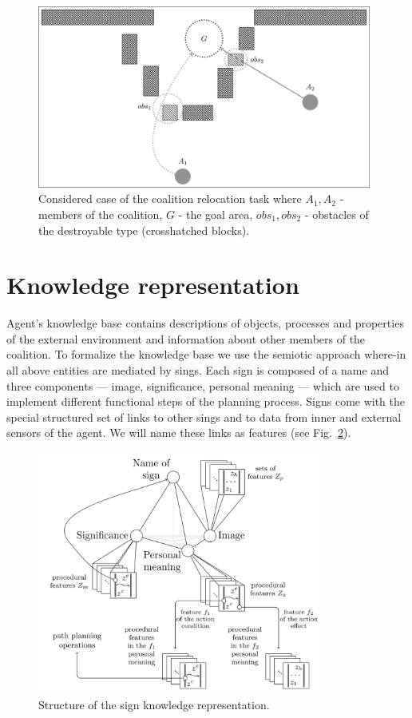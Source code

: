 \documentclass[runningheads,a4paper]{llncs}
\begin{document}
\begin{figure}
	\centering
	\includegraphics[height=6cm]{rita_example}
	\caption{Considered case of the coalition relocation task where $A_1, A_2$ - members of the coalition, $G$ - the goal area, $obs_1,obs_2$ - obstacles of the destroyable type (crosshatched blocks).}
	\label{fig:case}
\end{figure}

\section{Knowledge representation}\label{knowledge}

Agent's knowledge base contains descriptions of objects, processes and properties of the external environment and information about other members of the coalition. To formalize the knowledge base we use the semiotic approach where-in all above entities are mediated by sings.  Each sign is composed of a name and three components --- image, significance, personal meaning --- which are used to implement different functional steps of the planning process. Signs come with the special structured set of links to other sings and to data from inner and external sensors of the agent. We will name these links as features (see Fig.~\ref{fig:sign}).

\begin{figure}
	\centering
	\includegraphics[height=8cm]{sign_kr}
	\caption{Structure of the sign knowledge representation.}
	\label{fig:sign}
\end{figure}
\end{document}
